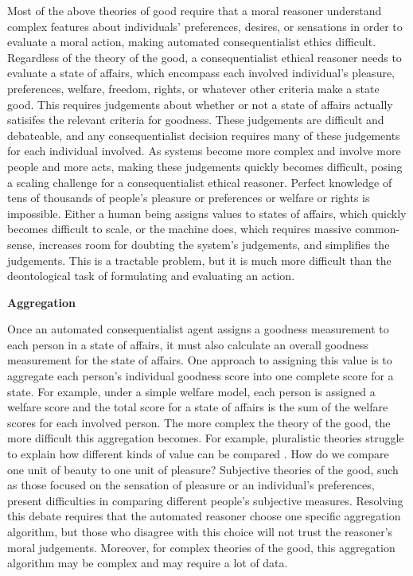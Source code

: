 \begin{isabellebody}
\begin{isamarkuptext}
Most of the above theories of good require that a moral reasoner understand complex features about
individuals' preferences, desires, or sensations in order to evaluate a moral action, making automated
consequentialist ethics difficult. Regardless of the theory of the good, a consequentialist ethical 
reasoner needs to evaluate a state of affairs, which encompass each involved individual's pleasure, 
preferences, welfare, freedom, rights, or whatever other criteria make a state good. This requires
judgements about whether or not a state of affairs actually satisifes the relevant criteria for goodness. 
These judgements are difficult and debateable, and any consequentialist decision requires many of 
these judgements for each individual involved. As systems become more complex and involve more people and 
more acts, making these judgements quickly becomes difficult, posing a scaling challenge for a 
consequentialist ethical reasoner. Perfect knowledge of tens of thousands of people's pleasure or 
preferences or welfare or rights is impossible. Either a human being 
assigns values to states of affairs, which quickly becomes difficult to scale, or the machine does, 
which requires massive common-sense, increases room for doubting the system's judgements, and simplifies
the judgements. This is a tractable problem, but it is much more difficult than the deontological task of formulating
and evaluating an action.%
\end{isamarkuptext}\isamarkuptrue%
%
\begin{isamarkuptext}%
\textbf{Aggregation}%
\end{isamarkuptext}\isamarkuptrue%
%
\begin{isamarkuptext}%
Once an automated consequentialist agent assigns a goodness measurement to each person in a state of affairs, it 
must also calculate an overall goodness measurement for the state of affairs. One approach to assigning
this value is to aggregate each person's individual goodness score into one complete score for a state. 
For example, under a simple welfare model, each person is assigned a welfare score and the total 
score for a state of affairs is the sum of the welfare scores for each involved person.
The more complex the theory of the good, the more difficult this aggregation becomes. For example, 
pluralistic theories struggle to explain how different kinds of value can be compared \citep{consequentialismsep}. 
How do we compare one unit of beauty to one unit of pleasure? Subjective theories of the good, such 
as those focused on the sensation of pleasure or an individual's preferences, present difficulties in 
comparing different people's subjective measures. Resolving this debate requires that the automated reasoner 
choose one specific aggregation algorithm, but those who disagree with this choice will not trust 
the reasoner's moral judgements. Moreover, for complex theories of the good, this aggregation algorithm
may be complex and may require a lot of data. 


\end{isamarkuptext}
\end{isabellebody}
